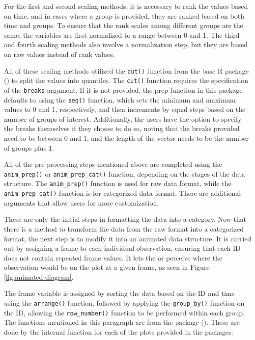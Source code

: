 For the first and second scaling methods, it is necessary to rank the values based on time, and in cases where a group is provided, they are ranked based on both time and groups. To ensure that the rank scales among different groups are the same, the variables are first normalized to a range between 0 and 1. The third and fourth scaling methods also involve a normalization step, but they are based on raw values instead of rank values.

All of these scaling methods utilized the \texttt{cut()} function from the base R package (\citet{r}) to split the values into quantiles. The \texttt{cut()} function requires the specification of the \texttt{breaks} argument. If it is not provided, the prep function in this package defaults to using the \texttt{seq()} function, which sets the minimum and maximum values to 0 and 1, respectively, and then increments by equal steps based on the number of groups of interest. Additionally, the users have the option to specify the breaks themselves if they choose to do so, noting that the breaks provided need to be between 0 and 1, and the length of the vector needs to be the number of groups plus 1.

All of the pre-processing steps mentioned above are completed using the \texttt{anim\_prep()} or \texttt{anim\_prep\_cat()} function, depending on the stages of the data structure. The \texttt{anim\_prep()} function is used for raw data format, while the \texttt{anim\_prep\_cat()} function is for categorized data format. There are additional arguments that allow users for more customization.

These are only the initial steps in formatting the data into a category. Now that there is a method to transform the data from the raw format into a categorized format, the next step is to modify it into an animated data structure. It is carried out by assigning a frame to each individual observation, ensuring that each ID does not contain repeated frame values. It lets the  or  perceive where the observation would be on the plot at a given frame, as seen in Figure \ref{fig:animated-diagram}.

The frame variable is assigned by sorting the data based on the ID and time using the \texttt{arrange()} function, followed by applying the \texttt{group\_by()} function on the ID, allowing the \texttt{row\_number()} function to be performed within each group. The functions mentioned in this paragraph are from the  package (\citet{dplyr}). These are done by the internal function for each of the plots provided in the packages.

